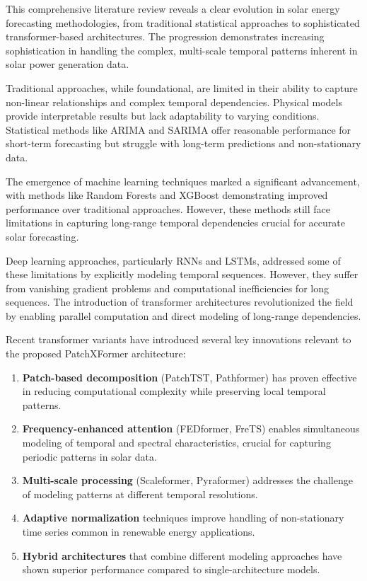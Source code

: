 \documentclass[12pt]{uomthesis}
\begin{document}
This comprehensive literature review reveals a clear evolution in solar energy forecasting methodologies, from traditional statistical approaches to sophisticated transformer-based architectures. The progression demonstrates increasing sophistication in handling the complex, multi-scale temporal patterns inherent in solar power generation data.

Traditional approaches, while foundational, are limited in their ability to capture non-linear relationships and complex temporal dependencies. Physical models provide interpretable results but lack adaptability to varying conditions. Statistical methods like ARIMA and SARIMA offer reasonable performance for short-term forecasting but struggle with long-term predictions and non-stationary data.

The emergence of machine learning techniques marked a significant advancement, with methods like Random Forests and XGBoost demonstrating improved performance over traditional approaches. However, these methods still face limitations in capturing long-range temporal dependencies crucial for accurate solar forecasting.

Deep learning approaches, particularly RNNs and LSTMs, addressed some of these limitations by explicitly modeling temporal sequences. However, they suffer from vanishing gradient problems and computational inefficiencies for long sequences. The introduction of transformer architectures revolutionized the field by enabling parallel computation and direct modeling of long-range dependencies.

Recent transformer variants have introduced several key innovations relevant to the proposed PatchXFormer architecture:

\begin{enumerate}
\item \textbf{Patch-based decomposition} (PatchTST, Pathformer) has proven effective in reducing computational complexity while preserving local temporal patterns.

\item \textbf{Frequency-enhanced attention} (FEDformer, FreTS) enables simultaneous modeling of temporal and spectral characteristics, crucial for capturing periodic patterns in solar data.

\item \textbf{Multi-scale processing} (Scaleformer, Pyraformer) addresses the challenge of modeling patterns at different temporal resolutions.

\item \textbf{Adaptive normalization} techniques improve handling of non-stationary time series common in renewable energy applications.

\item \textbf{Hybrid architectures} that combine different modeling approaches have shown superior performance compared to single-architecture models.
\end{enumerate}
\end{document}
